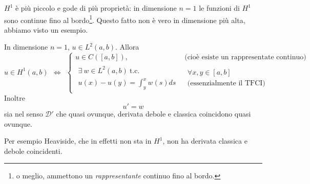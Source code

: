 \documentclass[10pt,a4paper,twoside,openright]{book}
\begin{document}
$H^{1}$ è più piccolo e gode di più proprietà: in dimensione $n=1$ le funzioni di $H^{1}$ sono continue fino al bordo\footnote{o meglio, ammettono un \textit{rappresentante} continuo fino al bordo.}. Questo fatto non è vero in dimensione più alta, abbiamo visto un esempio.
\begin{theorem}
	[Microteorema] In dimensione $n=1$, $u\in L^{2}( a,b)$. Allora
	\begin{equation*}
		u\in H^{1}( a,b) \ \ \Leftrightarrow \ \ \begin{cases}
		u\in C([ a,b]) , & \text{(cioè esiste un rappresentate continuo)}\\
		\begin{array}{l}
			\exists \ w\in L^{2}( a,b) \ \text{t.c.} \\
			u( x) -u( y) =\int ^{x}_{y} w( s) ds     
		\end{array} &  \begin{array}{l}
		\forall x,y\in [ a,b]\\
		\text{(essenzialmente il TFCI)}
		\end{array}
		\end{cases}
	\end{equation*}
	Inoltre
	\begin{equation*}
		u'=w
	\end{equation*}
	sia nel senso $\mathcal{D} '$ che quasi ovunque, derivata debole e classica coincidono quasi ovunque.
\end{theorem}
Per esempio Heaviside, che in effetti non sta in $H^{1}$, non ha derivata classica e debole coincidenti.
\end{document}
